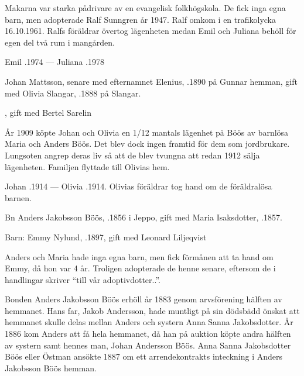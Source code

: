 Makarna var starka pådrivare av en evangelisk folkhögskola. De fick inga egna barn, men adopterade Ralf Sunngren år 1947. Ralf omkom i en trafikolycka 16.10.1961. Ralfs föräldrar övertog lägenheten medan Emil och Juliana behöll för egen del två rum i mangården.

Emil .1974  ---  Juliana .1978


Johan Mattsson, senare med efternamnet Elenius,  .1890 på Gunnar hemman, gift med Olivia Slangar, .1888 på Slangar.
\begin{jhchildren}
  \item {}
  \item {}, gift med Bertel Sarelin
\end{jhchildren}
År 1909 köpte Johan och Olivia en 1/12 mantals lägenhet på Böös av barnlösa Maria och Anders Böös. Det blev dock ingen framtid för dem som jordbrukare. Lungsoten angrep deras liv så att de blev tvungna att redan 1912 sälja lägenheten. Familjen flyttade till Olivias hem.

Johan .1914  ---  Olivia .1914. Olivias föräldrar tog hand om de föräldralösa barnen.


Bn Anders Jakobsson Böös, .1856 i Jeppo, gift med  Maria Isaksdotter, .1857.

Barn: Emmy Nylund, .1897, gift med Leonard Liljeqvist

Anders och Maria hade inga egna barn, men fick förmånen att ta hand om Emmy, då hon var 4 år. Troligen adopterade de henne senare, eftersom de i handlingar skriver ``till vår adoptivdotter..''.

Bonden Anders Jakobsson Böös erhöll år 1883 genom arvsförening hälften av  hemmanet. Hans far, Jakob Andersson, hade muntligt på sin dödsbädd önskat att hemmanet skulle delas mellan Anders och systern Anna Sanna Jakobsdotter. År 1886 kom Anders att få hela hemmanet, då han på auktion köpte andra hälften av systern samt hennes man, Johan Andersson Böös. Anna Sanna Jakobsdotter Böös eller Östman ansökte 1887 om ett arrendekontrakts inteckning i Anders Jakobsson Böös hemman.

